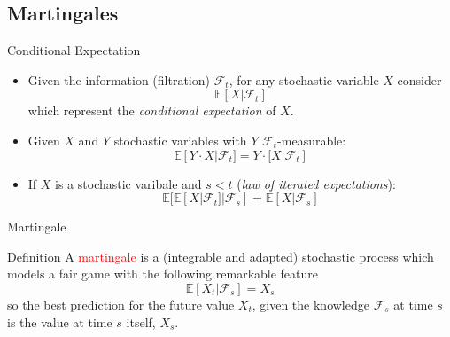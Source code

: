 \documentclass{beamer}
\begin{document}
\subsection{Martingales}
\begin{frame}{Conditional Expectation}
	\begin{itemize}
		\item Given the information (filtration) $\mathcal{F}_t$, for any stochastic variable $X$ consider
			\begin{equation*}
				\mathbb{E}[X|\mathcal{F}_t]
			\end{equation*}
			which represent the \emph{conditional expectation} of $X$.
		\item Given $X$ and $Y$ stochastic variables with $Y$ $\mathcal{F}_t$-measurable:
			\begin{equation*}
				\mathbb{E}[Y\cdot X|\mathcal{F}_t] =  Y\cdot\mathbb[X|\mathcal{F}_t]
			\end{equation*}
		\item If $X$ is a stochastic varibale and $s<t$ (\emph{law of iterated expectations}):
			\begin{equation*}
				\mathbb{E}[\mathbb{E}[X|\mathcal{F}_t]|\mathcal{F}_s] = \mathbb{E}[X|\mathcal{F}_s]
			\end{equation*}
	\end{itemize}
\end{frame}

\begin{frame}{Martingale}
	\begin{block}{Definition}
		A \textcolor{red}{martingale} is a (integrable and adapted) stochastic process which models a fair game with the following remarkable feature
		\begin{equation}
			\mathbb{E}[X_t|\mathcal{F}_s] = X_s
		\end{equation}
		so the best prediction for the future value $X_t$, given the knowledge $\mathcal{F}_s$ at time $s$ is the value at time $s$ itself, $X_s$.
	\end{block}
\end{frame}
\end{document}
